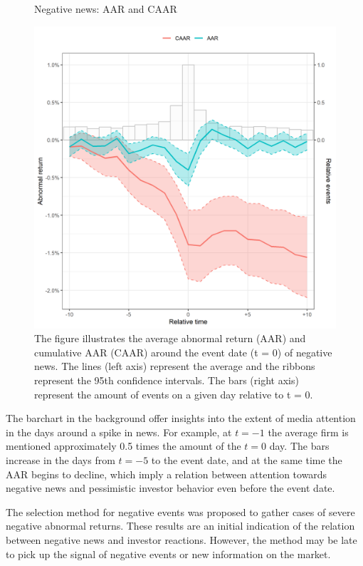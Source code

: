 \begin{figure} [H]
    \centering
    \caption{Negative news: AAR and CAAR}
    \includegraphics[scale=0.6]{Projekt/1.Figures analysis/ST_negative_all_CI.png}
     \caption*{\footnotesize The figure illustrates the average abnormal return (AAR) and cumulative AAR (CAAR) around the event date (t = 0) of negative news. The lines (left axis) represent the average and the ribbons represent the 95th confidence intervals. The bars (right axis) represent the amount of events on a given day relative to t = 0. }
    \label{fig:ST_neg_news}
\end{figure} 

 
The barchart in the background offer insights into the extent of media attention in the days around a spike in news. For example, at $t = -1$ the average firm is mentioned approximately 0.5 times the amount of the $t = 0$ day. The bars increase in the days from $t=-5$ to the event date, and at the same time the AAR begins to decline, which imply a relation between attention towards negative news and pessimistic investor behavior even before the event date. 

The selection method for negative events was proposed to gather cases of severe negative abnormal returns. These results are an initial indication of the relation between negative news and investor reactions. However, the method may be late to pick up the signal of negative events or new information on the market.  


